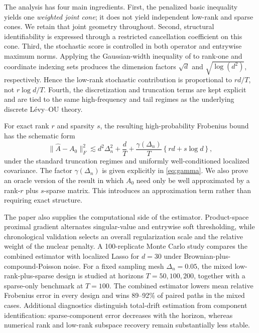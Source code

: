 \documentclass[12pt]{article}
\theoremstyle{definition}
\begin{document}
	The analysis has four main ingredients. First, the penalized basic inequality yields one \emph{weighted joint cone}; it does not yield independent low-rank and sparse cones. We retain that joint geometry throughout. Second, structural identifiability is expressed through a restricted cancellation coefficient on this cone. Third, the stochastic score is controlled in both operator and entrywise maximum norms. Applying the Gaussian-width inequality of \citet[Theorem~4.8]{DexheimerJeszka2026} to rank-one and coordinate indexing sets produces the dimension factors $\sqrt d$ and $\sqrt{\log(d^2)}$, respectively. Hence the low-rank stochastic contribution is proportional to $rd/T$, not $r\log d/T$. Fourth, the discretization and truncation terms are kept explicit and are tied to the same high-frequency and tail regimes as the underlying discrete L\'evy--OU theory.
	
	For exact rank $r$ and sparsity $s$, the resulting high-probability Frobenius bound has the schematic form
	\begin{equation}
		\|\widehat A-A_0\|_F^2 \lesssim d^2\Delta_n^2+\frac{d}{T} +\frac{\gamma(\Delta_n)}{T} \left\{rd+s\log d\right\},
		\label{eq:intro_rate}
	\end{equation}
	under the standard truncation regimes and uniformly well-conditioned localized covariance. The factor $\gamma(\Delta_n)$ is given explicitly in \eqref{eq:gamma}. We also prove an oracle version of the result in which $A_0$ need only be well approximated by a rank-$r$ plus $s$-sparse matrix. This introduces an approximation term rather than requiring exact structure.
	
	The paper also supplies the computational side of the estimator. Product-space proximal gradient alternates singular-value and entrywise soft thresholding, while chronological validation selects an overall regularization scale and the relative weight of the nuclear penalty. A 100-replicate Monte Carlo study compares the combined estimator with localized Lasso for $d=30$ under Brownian-plus-compound-Poisson noise. For a fixed sampling mesh $\Delta_n=0.05$, the mixed low-rank-plus-sparse design is studied at horizons $T=50,100,200$, together with a sparse-only benchmark at $T=100$. The combined estimator lowers mean relative Frobenius error in every design and wins 89--92\% of paired paths in the mixed cases. Additional diagnostics distinguish total-drift estimation from component identification: sparse-component error decreases with the horizon, whereas numerical rank and low-rank subspace recovery remain substantially less stable.
	
\end{document}
